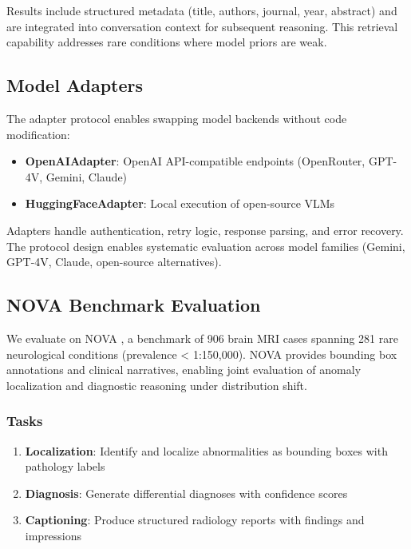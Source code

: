 \documentclass[11pt]{article}
\begin{document}
Results include structured metadata (title, authors, journal, year, abstract) and are integrated into conversation context for subsequent reasoning. This retrieval capability addresses rare conditions where model priors are weak.

\subsection{Model Adapters}

The adapter protocol enables swapping model backends without code modification:

\begin{itemize}
    \item \textbf{OpenAIAdapter}: OpenAI API-compatible endpoints (OpenRouter, GPT-4V, Gemini, Claude)
    \item \textbf{HuggingFaceAdapter}: Local execution of open-source VLMs
\end{itemize}

Adapters handle authentication, retry logic, response parsing, and error recovery. The protocol design enables systematic evaluation across model families (Gemini, GPT-4V, Claude, open-source alternatives).

\subsection{NOVA Benchmark Evaluation}

We evaluate on NOVA \citep{bercea2025nova}, a benchmark of 906 brain MRI cases spanning 281 rare neurological conditions (prevalence < 1:150,000). NOVA provides bounding box annotations and clinical narratives, enabling joint evaluation of anomaly localization and diagnostic reasoning under distribution shift.

\subsubsection{Tasks}

\begin{enumerate}
    \item \textbf{Localization}: Identify and localize abnormalities as bounding boxes with pathology labels
    \item \textbf{Diagnosis}: Generate differential diagnoses with confidence scores  
    \item \textbf{Captioning}: Produce structured radiology reports with findings and impressions
\end{enumerate}
\end{document}
